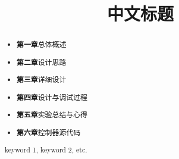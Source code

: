 \documentclass{mcmthesis}
\title{\LARGE\textbf{中文标题}} %
\begin{document}
\begin{abstract}
  \par
  \begin{itemize}
    \item \textbf{第一章}总体概述
    \item \textbf{第二章}设计思路
    \item \textbf{第三章}详细设计
    \item \textbf{第四章}设计与调试过程
    \item \textbf{第五章}实验总结与心得
    \item \textbf{第六章}控制器源代码
  \end{itemize}
  \begin{keywords}
    keyword 1, keyword 2, etc.
  \end{keywords}
\end{abstract}
\maketitle
\tableofcontents
\pagebreak






% 
\printbibliography
\end{document}
